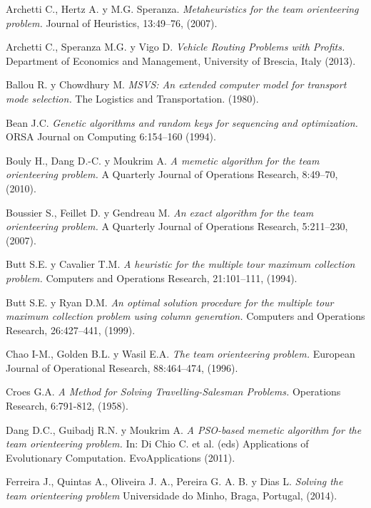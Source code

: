 \renewcommand\bibname{References}
\begin{thebibliography}{9}

Archetti C., Hertz A. y M.G. Speranza.
\textit{Metaheuristics for the team orienteering problem.} 
Journal of Heuristics, 13:49–76, (2007).

Archetti C., Speranza M.G. y Vigo D.
\textit{Vehicle Routing Problems with Profits.} 
Department of Economics and Management, University of Brescia, Italy (2013).

Ballou R. y Chowdhury M.
\textit{MSVS: An extended computer model for transport mode selection.} The Logistics and Transportation. (1980).

Bean J.C.
\textit{Genetic algorithms and random keys for sequencing and optimization.}
ORSA Journal on Computing 6:154–160 (1994).

Bouly H., Dang D.-C. y Moukrim A.
\textit{A memetic algorithm for the team orienteering problem.}
A Quarterly Journal of Operations Research, 8:49–70, (2010).

Boussier S., Feillet D. y Gendreau M.
\textit{An exact algorithm for the team orienteering problem.}
A Quarterly Journal of Operations Research, 5:211–230, (2007).

Butt S.E. y Cavalier T.M.
\textit{A heuristic for the multiple tour maximum collection problem.}
Computers and Operations Research, 21:101–111, (1994).

Butt S.E. y Ryan D.M. 
\textit{An optimal solution procedure for the multiple tour maximum collection problem using column generation.}
Computers and Operations Research, 26:427–441, (1999).

Chao I-M., Golden B.L. y Wasil E.A.
\textit{The team orienteering problem.}
European Journal of Operational Research, 88:464–474, (1996).

Croes G.A.
\textit{A Method for Solving Travelling-Salesman Problems.}
Operations Research, 6:791-812, (1958).

Dang D.C., Guibadj R.N. y Moukrim A.
\textit{A PSO-based memetic algorithm for the team orienteering problem.}
In: Di Chio C. et al. (eds) Applications of Evolutionary Computation. EvoApplications (2011).

Ferreira J., Quintas A., Oliveira J. A., Pereira G. A. B. y Dias L.
\textit{Solving the team orienteering problem}
Universidade do Minho, Braga, Portugal, (2014).


\end{thebibliography}
